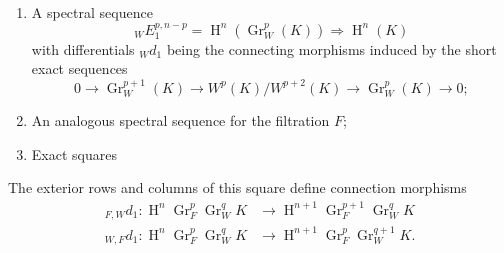     
 \begin{enumerate}
      
 \item[(a)]
        A spectral sequence
        \[           {}_W E_1^{p,n-p}           = \operatorname {H}^n(\operatorname {Gr}_W^p(K)) \Rightarrow  \operatorname {H}^n(K)         \]
        with differentials \({}_W d_1\) being the connecting morphisms induced by the short exact sequences
        \[           0           \to  \operatorname {Gr}_W^{p+1}(K)           \to  W^p(K)/W^{p+2}(K)           \to  \operatorname {Gr}_W^p(K)           \to  0;         \]
      


      
 \item[(b)]
        
        An analogous spectral sequence for the filtration \(F\);
      


      
 \item[(c)]
        Exact squares

        

      

    \end{enumerate}\par{}The exterior rows and columns of this square define connection morphisms
    \[       \begin {aligned}         {}_{F,W}d_1\colon  \operatorname {H}^n\operatorname {Gr}_F^p\operatorname {Gr}_W^q K         &\to  \operatorname {H}^{n+1}\operatorname {Gr}_F^{p+1}\operatorname {Gr}_W^q K       \\{}_{W,F}d_1\colon  \operatorname {H}^n\operatorname {Gr}_F^p\operatorname {Gr}_W^q K         &\to  \operatorname {H}^{n+1}\operatorname {Gr}_F^p\operatorname {Gr}_W^{q+1} K.       \end {aligned}     \]
